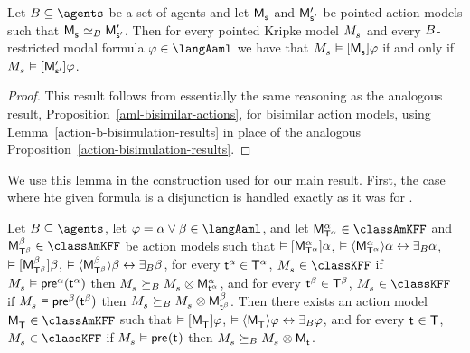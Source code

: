 \begin{corollary}
Let $\agentsB \subseteq \agents$ be a set of agents and let $\aPModel{\aStateS}$ and $\aPModelP{\aStateSP}$ be pointed action models such that $\aPModel{\aStateS} \bisimilar[\agentsB] \aPModelP{\aStateSP}$.
Then for every pointed Kripke model $\kPModel{\kStateS}$ and every $\agentsB$-restricted modal formula $\phi \in \langAaml$ we have that $\kPModel{\kStateS} \entails \actionA{\aPModel{\aStateS}} \phi$ if and only if $\kPModel{\kStateS} \entails \actionA{\aPModelP{\aStateSP}} \phi$.
\end{corollary}

\begin{proof}
This result follows from essentially the same reasoning as the analogous result, Proposition~\ref{aml-bisimilar-actions}, for bisimilar action models, using Lemma~\ref{action-b-bisimulation-results} in place of the analogous Proposition~\ref{action-bisimulation-results}.
\end{proof}

We use this lemma in the construction used for our main result.
First, the case where hte given formula is a disjunction is handled exactly as it was for \logicAamlK{}.

\begin{lemma}\label{aaml-k45-choice}
Let $\agentsB \subseteq \agents$, 
let $\phi = \alpha \lor \beta \in \langAaml$, and 
let $\aPModel[\alpha]{\aStatesT[\alpha]} \in \classAmKFF$ and $\aPModel[\beta]{\aStatesT[\beta]} \in \classAmKFF$ be action models such that 
$\entails \actionA{\aPModel[\alpha]{\aStatesT[\alpha]}} \alpha$, 
$\entails \actionE{\aPModel[\alpha]{\aStatesT[\alpha]}} \alpha \iff \someactsBs \alpha$, 
$\entails \actionA{\aPModel[\beta]{\aStatesT[\beta]}} \beta$,
$\entails \actionE{\aPModel[\beta]{\aStatesT[\beta]}} \beta \iff \someactsBs \beta$,
for every $\aStateT[\alpha] \in \aStatesT[\alpha]$, $\kPModel{\kStateS} \in \classKFF$ if $\kPModel{\kStateS} \entails \aPrecondition[\alpha](\aStateT[\alpha])$ then $\kPModel{\kStateS} \simulatesBs \kPModel{\kStateS} \exec \aPModel[\alpha]{\aStateT[\alpha]}$, and
for every $\aStateT[\beta] \in \aStatesT[\beta]$, $\kPModel{\kStateS} \in \classKFF$ if $\kPModel{\kStateS} \entails \aPrecondition[\beta](\aStateT[\beta])$ then $\kPModel{\kStateS} \simulatesBs \kPModel{\kStateS} \exec \aPModel[\beta]{\aStateT[\beta]}$.
Then there exists an action model $\aPModel{\aStatesT} \in \classAmKFF$ such that 
$\entails \actionA{\aPModel{\aStatesT}} \phi$,
$\entails \actionE{\aPModel{\aStatesT}} \phi \iff \someactsBs \phi$, and
for every $\aStateT \in \aStatesT$, $\kPModel{\kStateS} \in \classKFF$ if $\kPModel{\kStateS} \entails \aPrecondition(\aStateT)$ then $\kPModel{\kStateS} \simulatesBs \kPModel{\kStateS} \exec \aPModel{\aStateT}$.
\end{lemma}

